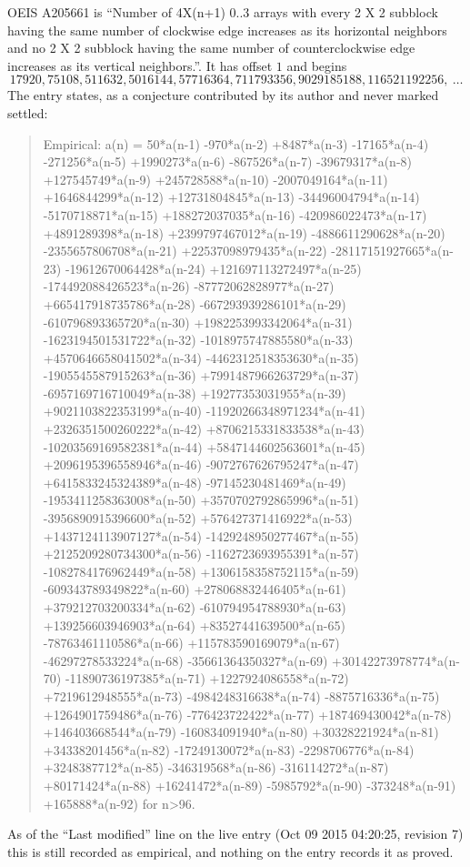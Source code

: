\documentclass[11pt,a4paper]{article}
\theoremstyle{plain}
\theoremstyle{definition}
\begin{document}
OEIS A205661 is ``Number of 4X(n+1) 0..3 arrays with every 2 X 2 subblock having the same number of clockwise edge increases as its horizontal neighbors and no 2 X 2 subblock having the same number of counterclockwise edge increases as its vertical neighbors.''. It has offset $1$ and begins
\[
17920, 75108, 511632, 5016144, 57716364, 711793356, 9029185188, 116521192256,\ \dots
\]
The entry states, as a conjecture contributed by its author and never marked settled:
\begin{quote}
Empirical: a(n) = 50*a(n-1) -970*a(n-2) +8487*a(n-3) -17165*a(n-4) -271256*a(n-5) +1990273*a(n-6) -867526*a(n-7) -39679317*a(n-8) +127545749*a(n-9) +245728588*a(n-10) -2007049164*a(n-11) +1646844299*a(n-12) +12731804845*a(n-13) -34496004794*a(n-14) -5170718871*a(n-15) +188272037035*a(n-16) -420986022473*a(n-17) +4891289398*a(n-18) +2399797467012*a(n-19) -4886611290628*a(n-20) -2355657806708*a(n-21) +22537098979435*a(n-22) -28117151927665*a(n-23) -19612670064428*a(n-24) +121697113272497*a(n-25) -174492088426523*a(n-26) -87772062828977*a(n-27) +665417918735786*a(n-28) -667293939286101*a(n-29) -610796893365720*a(n-30) +1982253993342064*a(n-31) -1623194501531722*a(n-32) -1018975747885580*a(n-33) +4570646658041502*a(n-34) -4462312518353630*a(n-35) -1905545587915263*a(n-36) +7991487966263729*a(n-37) -6957169716710049*a(n-38) +19277353031955*a(n-39) +9021103822353199*a(n-40) -11920266348971234*a(n-41) +2326351500260222*a(n-42) +8706215331833538*a(n-43) -10203569169582381*a(n-44) +5847144602563601*a(n-45) +2096195396558946*a(n-46) -9072767626795247*a(n-47) +6415833245324389*a(n-48) -97145230481469*a(n-49) -1953411258363008*a(n-50) +3570702792865996*a(n-51) -3956890915396600*a(n-52) +576427371416922*a(n-53) +1437124113907127*a(n-54) -1429248950277467*a(n-55) +2125209280734300*a(n-56) -1162723693955391*a(n-57) -1082784176962449*a(n-58) +1306158358752115*a(n-59) -609343789349822*a(n-60) +278068832446405*a(n-61) +379212703200334*a(n-62) -610794954788930*a(n-63) +139256603946903*a(n-64) +83527441639500*a(n-65) -78763461110586*a(n-66) +115783590169079*a(n-67) -46297278533224*a(n-68) -35661364350327*a(n-69) +30142273978774*a(n-70) -11890736197385*a(n-71) +1227924086558*a(n-72) +7219612948555*a(n-73) -4984248316638*a(n-74) -8875716336*a(n-75) +1264901759486*a(n-76) -776423722422*a(n-77) +187469430042*a(n-78) +146403668544*a(n-79) -160834091940*a(n-80) +30328221924*a(n-81) +34338201456*a(n-82) -17249130072*a(n-83) -2298706776*a(n-84) +3248387712*a(n-85) -346319568*a(n-86) -316114272*a(n-87) +80171424*a(n-88) +16241472*a(n-89) -5985792*a(n-90) -373248*a(n-91) +165888*a(n-92) for n>96.
\end{quote}
As of the ``Last modified'' line on the live entry (Oct 09 2015 04:20:25, revision 7) this is still
recorded as empirical, and nothing on the entry records it as proved.
\end{document}
